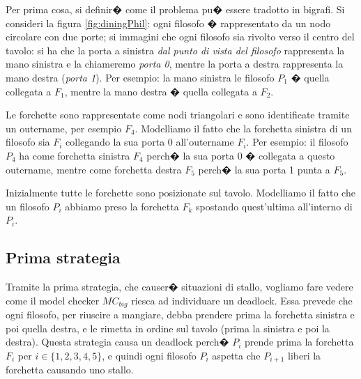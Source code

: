 Per prima cosa, si definir� come il problema pu� essere tradotto in bigrafi. Si consideri la figura \ref{fig:diningPhil}: ogni filosofo � rappresentato da un nodo circolare con due porte; si immagini che ogni filosofo sia rivolto verso il centro del tavolo: si ha che la porta a sinistra \emph{dal punto di vista del filosofo} rappresenta la mano sinistra e la chiameremo \emph{porta 0}, mentre la porta a destra rappresenta la mano destra (\emph{porta 1}). Per esempio: la mano sinistra le filosofo $P_1$ � quella collegata a $F_1$, mentre la mano destra � quella collegata a $F_2$.

Le forchette sono rappresentate come nodi triangolari e sono identificate tramite un outername, per esempio $F_4$. Modelliamo il fatto che la forchetta sinistra di un filosofo sia $F_i$ collegando la sua porta 0 all'outername $F_i$. Per esempio: il filosofo $P_4$ ha come forchetta sinistra $F_4$ perch� la sua porta 0 � collegata a questo outername, mentre come forchetta destra $F_5$ perch� la sua porta 1 punta a $F_5$.

Inizialmente tutte le forchette sono posizionate sul tavolo. Modelliamo il fatto che un filosofo $P_i$ abbiamo preso la forchetta $F_k$ spostando quest'ultima all'interno di $P_i$.

\subsection{Prima strategia}
Tramite la prima strategia, che causer� situazioni di stallo, vogliamo fare vedere come il model checker $MC_{big}$ riesca ad individuare un deadlock. Essa prevede che ogni filosofo, per riuscire a mangiare, debba prendere prima la forchetta sinistra e poi quella destra, e le rimetta in ordine sul tavolo (prima la sinistra e poi la destra). Questa strategia causa un deadlock perch� $P_i$ prende prima la forchetta $F_i$ per $i \in \{1,2,3,4,5\}$, e quindi ogni filosofo $P_i$ aspetta che $P_{i+1}$ liberi la forchetta causando uno stallo.


